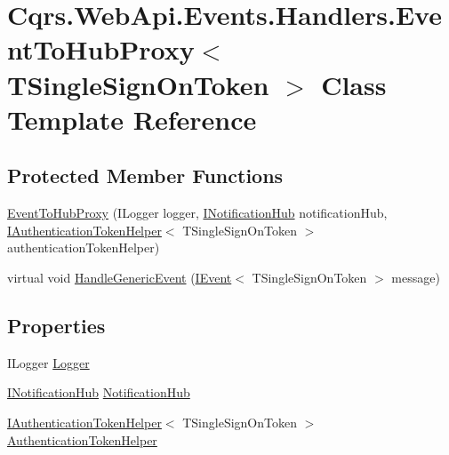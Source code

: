 \hypertarget{classCqrs_1_1WebApi_1_1Events_1_1Handlers_1_1EventToHubProxy}{}\section{Cqrs.\+Web\+Api.\+Events.\+Handlers.\+Event\+To\+Hub\+Proxy$<$ T\+Single\+Sign\+On\+Token $>$ Class Template Reference}
\label{classCqrs_1_1WebApi_1_1Events_1_1Handlers_1_1EventToHubProxy}
\subsection*{Protected Member Functions}
\begin{DoxyCompactItemize}
\item 
\hyperlink{classCqrs_1_1WebApi_1_1Events_1_1Handlers_1_1EventToHubProxy_aa9e279ac2652f76abb9cb01b8a3aa73a_aa9e279ac2652f76abb9cb01b8a3aa73a}{Event\+To\+Hub\+Proxy} (I\+Logger logger, \hyperlink{interfaceCqrs_1_1WebApi_1_1SignalR_1_1Hubs_1_1INotificationHub}{I\+Notification\+Hub} notification\+Hub, \hyperlink{interfaceCqrs_1_1Authentication_1_1IAuthenticationTokenHelper}{I\+Authentication\+Token\+Helper}$<$ T\+Single\+Sign\+On\+Token $>$ authentication\+Token\+Helper)
\item 
virtual void \hyperlink{classCqrs_1_1WebApi_1_1Events_1_1Handlers_1_1EventToHubProxy_a10f32c22e64196537ea8e8255befa406_a10f32c22e64196537ea8e8255befa406}{Handle\+Generic\+Event} (\hyperlink{interfaceCqrs_1_1Events_1_1IEvent}{I\+Event}$<$ T\+Single\+Sign\+On\+Token $>$ message)
\end{DoxyCompactItemize}
\subsection*{Properties}
\begin{DoxyCompactItemize}
\item 
I\+Logger \hyperlink{classCqrs_1_1WebApi_1_1Events_1_1Handlers_1_1EventToHubProxy_a36c8326ac1ad7458fe144cef3829fd25_a36c8326ac1ad7458fe144cef3829fd25}{Logger}
\item 
\hyperlink{interfaceCqrs_1_1WebApi_1_1SignalR_1_1Hubs_1_1INotificationHub}{I\+Notification\+Hub} \hyperlink{classCqrs_1_1WebApi_1_1Events_1_1Handlers_1_1EventToHubProxy_a919d1523b0df98b24db0ff54e6583436_a919d1523b0df98b24db0ff54e6583436}{Notification\+Hub}
\item 
\hyperlink{interfaceCqrs_1_1Authentication_1_1IAuthenticationTokenHelper}{I\+Authentication\+Token\+Helper}$<$ T\+Single\+Sign\+On\+Token $>$ \hyperlink{classCqrs_1_1WebApi_1_1Events_1_1Handlers_1_1EventToHubProxy_af17155895dcb10f4288094a20f271372_af17155895dcb10f4288094a20f271372}{Authentication\+Token\+Helper}
\end{DoxyCompactItemize}


